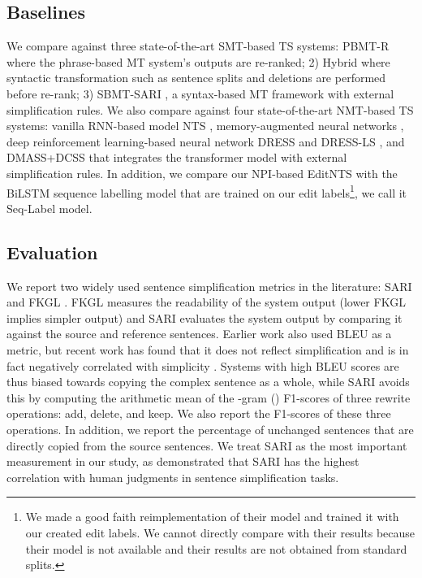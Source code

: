 \documentclass[11pt,a4paper]{article}
\def\seqlabels{Seq-Label }
\def\editnet{EditNTS}
\begin{document}
\subsection{Baselines}
We compare against three state-of-the-art SMT-based TS systems: PBMT-R \citep{wubben2012sentence} where the phrase-based MT system's outputs are re-ranked; 2) Hybrid \citep{narayan2014hybrid} where syntactic transformation such as sentence splits and deletions are performed before re-rank; 3) SBMT-SARI \citep{xu2016optimizing}, a syntax-based MT framework with external simplification rules. We also compare against four state-of-the-art NMT-based TS systems: vanilla RNN-based model NTS \cite{nisioi2017exploring}, memory-augmented neural networks  \cite{vu2018sentence}, deep reinforcement learning-based neural network DRESS and  DRESS-LS \citep{zhang2017sentence}, and DMASS+DCSS \citep{zhao2018integrating} that integrates the transformer model with external simplification rules. In addition, we compare our NPI-based \editnet{} with the BiLSTM sequence labelling model \citep{alva2017learning} that are trained on our edit labels\footnote{We made a good faith reimplementation of their model and trained it with our created edit labels. We cannot directly compare with their results because their model is not available and their results are not obtained from standard splits.}, we call it \seqlabels model. 
\subsection{Evaluation}
\label{sec:eval}
We report two widely used sentence simplification metrics in the literature: SARI \citep{xu2016optimizing} and FKGL \cite{kincaid1975derivation}. FKGL \citep{kincaid1975derivation} measures the readability of the system output (lower FKGL
implies simpler output) and SARI \citep{xu2016optimizing} evaluates the system output by comparing it against the source and reference sentences. Earlier work also used BLEU as a metric, but recent work has found that it does not reflect simplification \citep{xu2016optimizing} and is in fact negatively correlated with simplicity \citep{sulem2018bleu}. Systems with high BLEU scores are thus biased towards copying the complex sentence as a whole, while SARI avoids this by computing  the  arithmetic  mean  of the -gram () F1-scores of three rewrite operations: add, delete, and keep. We also report the F1-scores of these three operations. In addition, we report the percentage of unchanged sentences that are directly copied from the source sentences. We treat SARI as the most important measurement in our study, as \citet{xu2016optimizing} demonstrated that SARI has the highest correlation with human judgments in sentence simplification tasks. 
\end{document}
